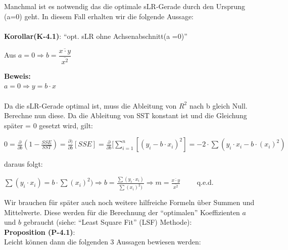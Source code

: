 \documentclass[12pt]{article}
\begin{document}
%
Manchmal ist es notwendig das die optimale sLR-Gerade durch den Ursprung (a=0) geht. In diesem Fall erhalten wir die folgende Aussage:\\
\\[0.2cm]
\textbf{Korollar(K-4.1)}: “opt. sLR ohne Achsenabschnitt(a =0)”\\
\begin{center}
\begin{large}
Aus $ a=0 \Rightarrow b = {\dfrac{\overline{x \cdot y}}{\overline{x^2}}}$  \\[0.2cm]                                          
\end{large}
\end{center}
\textbf{Beweis:}\\
$ a = 0 \Rightarrow y = b \cdot x$\\\\[0.1cm]
%                                                                           
Da die sLR-Gerade optimal ist, muss die Ableitung von $R^2$ nach b gleich Null. Berechne nun diese. Da die Ableitung von SST konstant ist und die Gleichung später = 0 gesetzt wird, gilt: 
\begin{center}
\begin{large}
$ 0 =\frac{\partial}{\partial b} (1-\frac{SSE}{SST}) = \frac{\partial)}{\partial b} [SSE] = \frac{\partial}{\partial b}[\sum\limits_{i=1}^n [(y_i - b \cdot x_i)^2] = -2 \cdot \sum(y_i \cdot x_i - b \cdot (x_i)^2) $ 
\end{large}
\end{center}
daraus folgt:
\begin{center}
\begin{large}
$ \sum(y_i \cdot x_i) =  b \cdot \sum(x_i)^2) \Rightarrow b = \frac{\sum(y_i \cdot x_i) }{\sum(x_i)^2)} \Rightarrow m = \frac{\overline{x \cdot y}}{\overline{x^2}} \qquad $ q.e.d.     \\[0.5cm] 
\end{large}
\end{center} 
%
Wir brauchen für später auch noch weitere hilfreiche Formeln über Summen und Mittelwerte. Diese werden für die Berechnung der “optimalen” Koeffizienten $a$ und $b$ gebraucht (siehe: “Least Square Fit” (LSF) Methode):\\[0.8cm]
%                                                                                                                                     
\textbf{Proposition (P-4.1)}:\\[0.2cm]
%
Leicht können dann die folgenden 3 Aussagen bewiesen werden: \\
\end{document}

